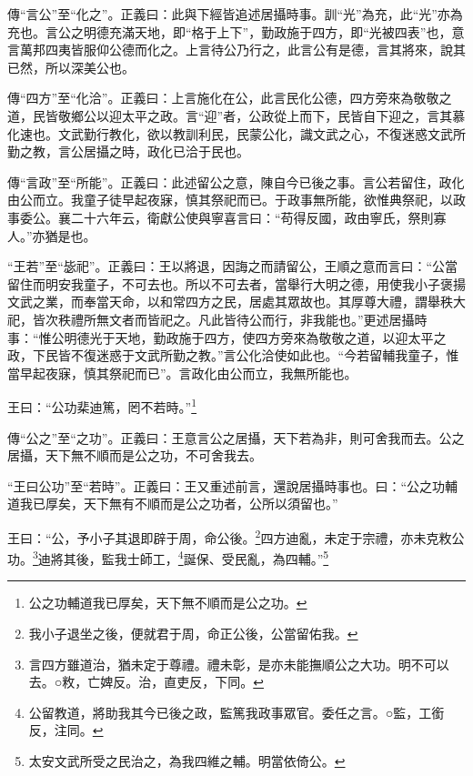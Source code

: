 {\noindent\zhuan{}\fzbyks 傳“言公”至“化之”。正義曰：此與下經皆追述居攝時事。訓“光”為充，此“光”亦為充也。言公之明德充滿天地，即“格于上下”，勤政施于四方，即“光被四表”也，意言萬邦四夷皆服仰公德而化之。上言待公乃行之，此言公有是德，言其將來，說其已然，所以深美公也。 \par}

{\noindent\zhuan{}\fzbyks 傳“四方”至“化洽”。正義曰：上言施化在公，此言民化公德，四方旁來為敬敬之道，民皆敬鄉公以迎太平之政。言“迎”者，公政從上而下，民皆自下迎之，言其慕化速也。文武勤行教化，欲以教訓利民，民蒙公化，識文武之心，不復迷惑文武所勤之教，言公居攝之時，政化已洽于民也。 \par}

{\noindent\zhuan{}\fzbyks 傳“言政”至“所能”。正義曰：此述留公之意，陳自今已後之事。言公若留住，政化由公而立。我童子徒早起夜寐，慎其祭祀而已。于政事無所能，欲惟典祭祀，以政事委公。襄二十六年云，衛獻公使與寧喜言曰：“苟得反國，政由寧氏，祭則寡人。”亦猶是也。 \par}

{\noindent\shu{}\fzkt “王若”至“毖祀”。正義曰：王以將退，因誨之而請留公，王順之意而言曰：“公當留住而明安我童子，不可去也。所以不可去者，當舉行大明之德，用使我小子褒揚文武之業，而奉當天命，以和常四方之民，居處其眾故也。其厚尊大禮，謂舉秩大祀，皆次秩禮所無文者而皆祀之。凡此皆待公而行，非我能也。”更述居攝時事：“惟公明德光于天地，勤政施于四方，使四方旁來為敬敬之道，以迎太平之政，下民皆不復迷惑于文武所勤之教。”言公化洽使如此也。“今若留輔我童子，惟當早起夜寐，慎其祭祀而已”。言政化由公而立，我無所能也。 \par}

王曰：“公功棐迪篤，罔不若時。”\footnote{公之功輔道我已厚矣，天下無不順而是公之功。}

{\noindent\zhuan{}\fzbyks 傳“公之”至“之功”。正義曰：王意言公之居攝，天下若為非，則可舍我而去。公之居攝，天下無不順而是公之功，不可舍我去。 \par}

{\noindent\shu{}\fzkt “王曰公功”至“若時”。正義曰：王又重述前言，還說居攝時事也。曰：“公之功輔道我已厚矣，天下無有不順而是公之功者，公所以須留也。” \par}

王曰：“公，予小子其退即辟于周，命公後。\footnote{我小子退坐之後，便就君于周，命正公後，公當留佑我。}四方迪亂，未定于宗禮，亦未克敉公功。\footnote{言四方雖道治，猶未定于尊禮。禮未彰，是亦未能撫順公之大功。明不可以去。○敉，亡婢反。治，直吏反，下同。}迪將其後，監我士師工，\footnote{公留教道，將助我其今已後之政，監篤我政事眾官。委任之言。○監，工銜反，注同。}誕保、受民亂，為四輔。”\footnote{太安文武所受之民治之，為我四維之輔。明當依倚公。}


